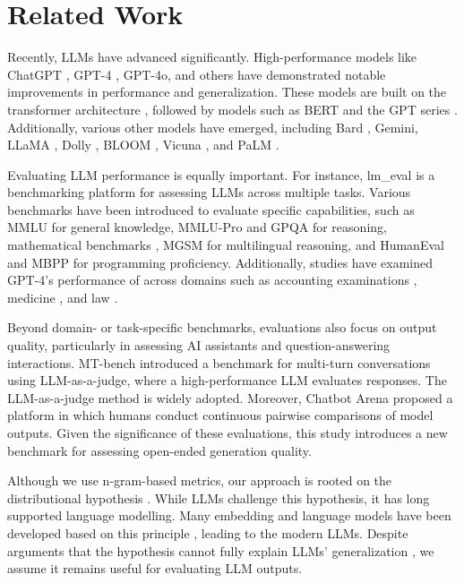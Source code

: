 \section{Related Work}
Recently, LLMs have advanced significantly.
High-performance models like ChatGPT \cite{chatgpt}, GPT-4 \cite{GPT4}, GPT-4o, and others have demonstrated notable improvements in performance and generalization.
These models are built on the transformer architecture \cite{Vaswani2017}, followed by models such as BERT \cite{Devlin2018} and the GPT series \cite{GPT-1, GPT-2, GPT-3}.
Additionally, various other models have emerged, including Bard \cite{bard}, Gemini, LLaMA \cite{touvron2023llama, Touvron2023}, Dolly \cite{dolly}, BLOOM \cite{scao2022bloom}, Vicuna \cite{vicuna}, and PaLM \cite{Chowdhery2022, Anil2023}.

Evaluating LLM performance is equally important.
For instance, lm\_eval \cite{eval-harness} is a benchmarking platform for assessing LLMs across multiple tasks.
Various benchmarks have been introduced to evaluate specific capabilities, such as MMLU \cite{hendryckstest2021} for general knowledge, MMLU-Pro \cite{wang2024mmlu} and GPQA \cite{rein2023gpqa} for reasoning, mathematical benchmarks \cite{cobbe2021gsm8k, hendrycksmath2021}, MGSM \cite{shi2022language} for multilingual reasoning, and HumanEval \cite{chen2021codex} and MBPP \cite{austin2021program} for programming proficiency.
Additionally, studies have examined GPT-4’s performance of \cite{GPT4} across domains such as accounting examinations \cite{Eulerich2023}, medicine \cite{Nori2023}, and law \cite{Iu2023, Choi2023}.

Beyond domain- or task-specific benchmarks, evaluations also focus on output quality, particularly in assessing AI assistants and question-answering interactions.
MT-bench \cite{MT-bench} introduced a benchmark for multi-turn conversations using LLM-as-a-judge, where a high-performance LLM evaluates responses.
The LLM-as-a-judge method is widely adopted.
Moreover, Chatbot Arena \cite{chiang2024chatbot} proposed a platform in which humans conduct continuous pairwise comparisons of model outputs.
Given the significance of these evaluations, this study introduces a new benchmark for assessing open-ended generation quality.

Although we use n-gram-based metrics, our approach is rooted on the distributional hypothesis \cite{harris1954distributional}.
While LLMs challenge this hypothesis, it has long supported language modelling.
Many embedding and language models have been developed based on this principle \cite{mikolov2013efficient,sarzynska2021detecting,bojanowski2017enriching,Devlin2018}, leading to the modern LLMs.
Despite arguments that the hypothesis cannot fully explain LLMs' generalization \cite{chiang2023distributional,enyan2024llms}, we assume it remains useful for evaluating LLM outputs.